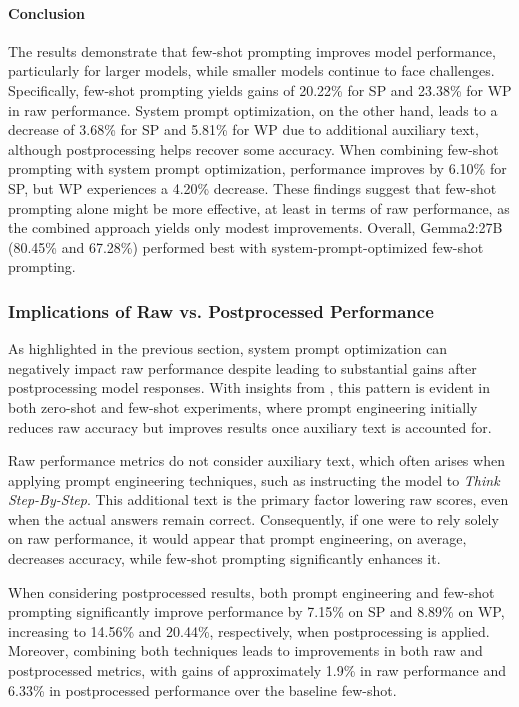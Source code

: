 \paragraph{Conclusion}

The results demonstrate that few-shot prompting improves model performance, particularly for larger models, while smaller models continue to face challenges. Specifically, few-shot prompting yields gains of 20.22\% for \acf{SP} and 23.38\% for \acf{WP} in raw performance. System prompt optimization, on the other hand, leads to a decrease of 3.68\% for \ac{SP} and 5.81\% for \ac{WP} due to additional auxiliary text, although postprocessing helps recover some accuracy. When combining few-shot prompting with system prompt optimization, performance improves by 6.10\% for \ac{SP}, but \ac{WP} experiences a 4.20\% decrease. These findings suggest that few-shot prompting alone might be more effective, at least in terms of raw performance, as the combined approach yields only modest improvements. Overall, Gemma2:27B (80.45\% and 67.28\%) performed best with system-prompt-optimized few-shot prompting.

\subsubsection{Implications of Raw vs. Postprocessed Performance}
\label{par:raw-vs-post-performance}

As highlighted in the previous section, system prompt optimization can negatively impact raw performance despite leading to substantial gains after postprocessing model responses. With insights from , this pattern is evident in both zero-shot and few-shot experiments, where prompt engineering initially reduces raw accuracy but improves results once auxiliary text is accounted for.

Raw performance metrics do not consider auxiliary text, which often arises when applying prompt engineering techniques, such as instructing the model to \textit{Think Step-By-Step}. This additional text is the primary factor lowering raw scores, even when the actual answers remain correct. Consequently, if one were to rely solely on raw performance, it would appear that prompt engineering, on average, decreases accuracy, while few-shot prompting significantly enhances it.

When considering postprocessed results, both prompt engineering and few-shot prompting significantly improve performance by 7.15\% on \ac{SP} and 8.89\% on \ac{WP}, increasing to 14.56\% and 20.44\%, respectively, when postprocessing is applied. Moreover, combining both techniques leads to improvements in both raw and postprocessed metrics, with gains of approximately 1.9\% in raw performance and 6.33\% in postprocessed performance over the baseline few-shot.

